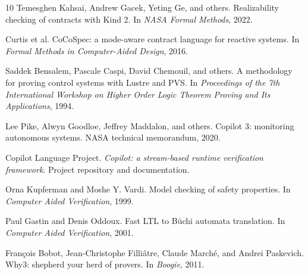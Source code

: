 \documentclass[11pt,a4paper]{article}
\begin{document}
\begin{thebibliography}{10}
Temesghen Kahsai, Andrew Gacek, Yeting Ge, and others.
\newblock Realizability checking of contracts with Kind 2.
\newblock In \emph{NASA Formal Methods}, 2022.

Curtis et al.
\newblock CoCoSpec: a mode-aware contract language for reactive systems.
\newblock In \emph{Formal Methods in Computer-Aided Design}, 2016.

Saddek Bensalem, Pascale Caspi, David Chemouil, and others.
\newblock A methodology for proving control systems with Lustre and PVS.
\newblock In \emph{Proceedings of the 7th International Workshop on Higher
  Order Logic Theorem Proving and Its Applications}, 1994.

Lee Pike, Alwyn Goodloe, Jeffrey Maddalon, and others.
\newblock Copilot 3: monitoring autonomous systems.
\newblock NASA technical memorandum, 2020.

Copilot Language Project.
\newblock \emph{Copilot: a stream-based runtime verification framework}.
\newblock Project repository and documentation.

Orna Kupferman and Moshe Y. Vardi.
\newblock Model checking of safety properties.
\newblock In \emph{Computer Aided Verification}, 1999.

Paul Gastin and Denis Oddoux.
\newblock Fast LTL to B{\"u}chi automata translation.
\newblock In \emph{Computer Aided Verification}, 2001.

Fran{\c c}ois Bobot, Jean-Christophe Filli{\^a}tre, Claude March{\'e}, and
Andrei Paskevich.
\newblock Why3: shepherd your herd of provers.
\newblock In \emph{Boogie}, 2011.

\end{thebibliography}
\end{document}
